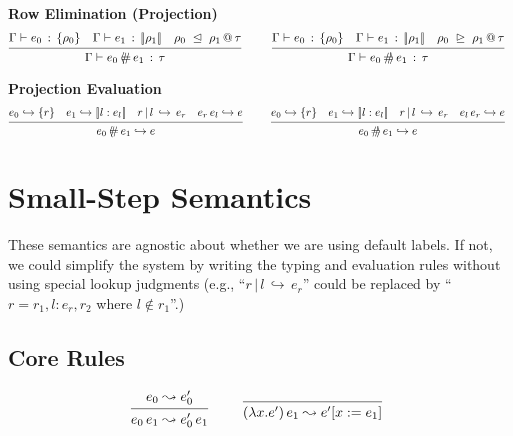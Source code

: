 \documentclass{article}
\makeatletter
\newcommand{\define}{::=}
\newcommand{\G}{\Gamma}
\newcommand{\variant}[1]{[\!|#1|\!]}
\newcommand{\app}[2]{#1\,#2}
\newcommand{\lam}[2]{\lambda #1 . #2}
\newcommand{\hastp}[3]{#1 \vdash #2 \,:\, #3}
\newcommand{\projFun}{\,\langle\!\!\#\,}
\newcommand{\projArg}{\,\#\!\!\rangle\,}
\newcommand{\projFunRule}[3]{#1 \;\trianglelefteq\; #2 \,@\, #3}
\newcommand{\projArgRule}[3]{#1 \;\trianglerighteq\; #2 \,@\, #3}
\newcommand{\haslbltm}[3]{#1\,|\,#2\,\hookrightarrow\, #3}
\newcommand{\eval}[2]{#1 \hookrightarrow #2}
\newcommand{\step}[2]{#1 \leadsto #2}
\newcommand{\deduct}[3][]
{
  \begin{prooftree}
    \hypo{#2}
    \infer1[\text{#1}]{#3}
  \end{prooftree}
}
\makeatother
\begin{document}

\noindent
\textbf{Row Elimination (Projection)}
\[
\deduct
    {\hastp{\G}{e_0}{\{\rho_0\}}
     \quad
     \hastp{\G}{e_1}{\variant{\rho_1}}
     \quad
     \projFunRule{\rho_0}{\rho_1}{\tau}
    }
    {\hastp{\G}{e_0\projFun e_1}{\tau}}
    {}
\qquad
\deduct
    {\hastp{\G}{e_0}{\{\rho_0\}}
     \quad
     \hastp{\G}{e_1}{\variant{\rho_1}}
     \quad
     \projArgRule{\rho_0}{\rho_1}{\tau}
    }
    {\hastp{\G}{e_0\projArg e_1}{\tau}}
    {}
\]

\noindent
\textbf{Projection Evaluation}
\[
\deduct
    {\eval{e_0}{\{r\}}
     \quad
     \eval{e_1}{\variant{l:e_l}}
     \quad
     \haslbltm{r}{l}{e_r}
     \quad
     \eval{\app{e_r}{e_l}}{e}
    }
    {\eval{e_0\projFun e_1}{e}}
    {}
\qquad
\deduct
    {\eval{e_0}{\{r\}}
     \quad
     \eval{e_1}{\variant{l:e_l}}
     \quad
     \haslbltm{r}{l}{e_r}
     \quad
     \eval{\app{e_l}{e_r}}{e}
    }
    {\eval{e_0\projArg e_1}{e}}
    {}
\]

\section{Small-Step Semantics}

These semantics are agnostic about whether we are using default labels. If not, we could simplify
the system by writing the typing and evaluation rules without using special lookup judgments
(e.g., ``$\haslbltm{r}{l}{e_r}$'' could be replaced by ``$r = r_1, l{:}e_r, r_2$ where $l\not\in r_1$''.)



\subsection{Core Rules}
\[
\deduct
    {\step{e_0}{e'_0}}
    {\step{\app{e_0}{e_1}}{\app{e'_0}{e_1}}}
    {}
\qquad
\deduct
    {}
    {\step{\app{(\lam{x}{e'})}{e_1}}{e'[x:=e_1]}}
    {}
\]
\end{document}
